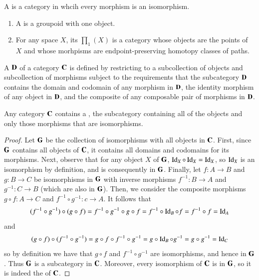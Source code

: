 \documentclass[12pt, a4paper, oneside, openright, titlepage]{book}
\begin{document}
\begin{defn}
    A  is a category in whcih every morphism is an isomorphism.
\end{defn}

\begin{defn}
    \leavevmode
    \begin{enumerate}
        \item A  is a groupoid with one object.
        \item For any space $X$, its  $\prod_1(X)$ is a category whose objects are the points of $X$ and whose morhpisms are endpoint-preserving homotopy classes of paths.
    \end{enumerate}
\end{defn}

\begin{defn}
    A  $\normalfont\textbf{D}$ of a category $\normalfont\textbf{C}$ is defined by restricting to a subcollection of objects and subcollection of morphisms subject to the requirements that the subcategory $\normalfont\textbf{D}$ contains the domain and codomain of any morphism in $\normalfont\textbf{D}$, the identity morphism of any object in $\normalfont\textbf{D}$, and the composite of any composable pair of morphisms in $\normalfont\textbf{D}$.
\end{defn}


\begin{lem}
    Any category $\normalfont\textbf{C}$ contains a , the subcategory containing all of the objects and only those morphisms that are isomorphisms.
\end{lem}
\begin{proof}
    Let $\normalfont\textbf{G}$ be the collection of isomorphisms with all objects in $\normalfont\textbf{C}$. First, since $\normalfont\textbf{G}$ contains all objects of $\normalfont\textbf{C}$, it contains all domains and codomains for its morphisms. Next, observe that for any object $X$ of $\normalfont\textbf{G}$, $\operatorname{Id}_X\circ \operatorname{Id}_X = \operatorname{Id}_X$, so $\operatorname{Id}_X$ is an isomorphism by definition, and is consequently in $\normalfont\textbf{G}$. Finally, let $f:A\rightarrow B$ and $g:B\rightarrow C$ be isomorphisms in $\normalfont\textbf{G}$ with inverse morphisms $f^{-1}:B\rightarrow A$ and $g^{-1}:C\rightarrow B$ (which are also in $\normalfont\textbf{G}$). Then, we consider the composite morphisms $g\circ f:A\rightarrow C$ and $f^{-1}\circ g^{-1}:c\rightarrow A$. It follows that \begin{equation*}
        (f^{-1}\circ g^{-1})\circ(g\circ f) = f^{-1}\circ g^{-1}\circ g\circ f = f^{-1}\circ \operatorname{Id}_B\circ f = f^{-1}\circ f = \operatorname{Id}_A
    \end{equation*}
    and \begin{equation*}
        (g\circ f)\circ (f^{-1}\circ g^{-1}) = g\circ f\circ f^{-1}\circ g^{-1} = g\circ \operatorname{Id}_B\circ g^{-1} = g\circ g^{-1} = \operatorname{Id}_C
    \end{equation*}
    so by definition we have that $g\circ f$ and $f^{-1}\circ g^{-1}$ are isomorphisms, and hence in $\normalfont\textbf{G}$. Thus $\normalfont\textbf{G}$ is a subcategory in $\normalfont\textbf{C}$. Moreover, every isomorphism of $\normalfont\textbf{C}$ is in $\normalfont\textbf{G}$, so it is indeed the  of $\normalfont\textbf{C}$.
\end{proof}
\end{document}

